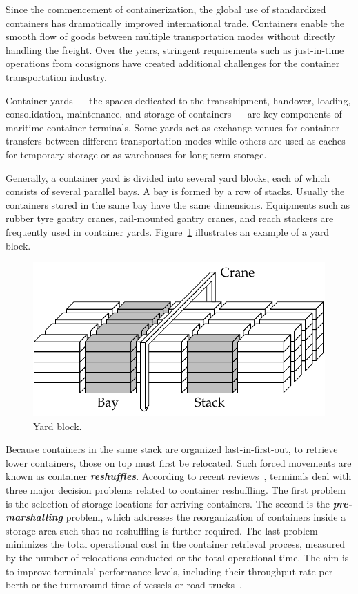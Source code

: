\documentclass[review,3p,times,12pt,number]{elsarticle}\usepackage{amsmath}\usepackage{amssymb}
\renewcommand{\emph}[1]{\textbf{\textit{#1}}}
\begin{document}
Since the commencement of containerization, the global use of standardized containers has dramatically improved international trade. Containers enable the smooth flow of goods between multiple transportation modes without directly handling the freight. Over the years, stringent requirements such as just-in-time operations from consignors have created additional challenges for the container transportation industry.

Container yards --- the spaces dedicated to the transshipment, handover, loading, consolidation, maintenance, and storage of containers --- are key components of maritime container terminals. Some yards act as exchange venues for container transfers between different transportation modes while others are used as caches for temporary storage or as warehouses for long-term storage.

Generally, a container yard is divided into several yard blocks, each of which consists of several parallel bays.  A bay is formed by a row of stacks. Usually the containers stored in the same bay have the same dimensions. Equipments such as rubber tyre gantry cranes, rail-mounted gantry cranes, and  reach stackers are frequently used in container yards. Figure~\ref{fig:block} illustrates an example of a yard block.

\begin{figure}[htbp]
\centering
\includegraphics{figs/block.pdf}
\caption{Yard block.}
\label{fig:block}
\end{figure}

Because containers in the same stack are organized last-in-first-out, to retrieve lower containers, those on top must first be relocated. Such forced movements are known as container \emph{reshuffles}. According to recent reviews~\citep{carlo2014,lehnfeld2014}, terminals deal with three major decision problems related to container reshuffling. The first problem is the selection of storage locations for arriving containers. The second is the \emph{pre-marshalling} problem, which addresses the reorganization of containers inside a storage area such that no reshuffling is further required. The last problem  minimizes the total operational cost in the container retrieval process, measured by the number of relocations conducted or the total operational time. The  aim is to improve terminals' performance levels, including their throughput rate per berth or the turnaround time of vessels or road trucks~\citep{kim2015}.
\end{document}
